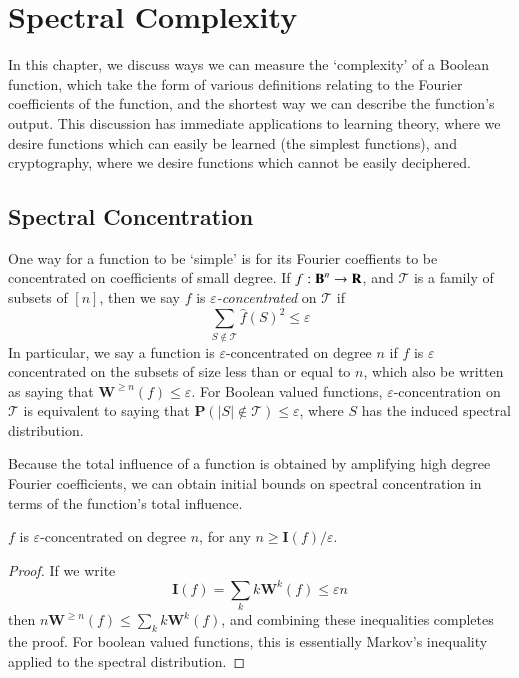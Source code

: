 \chapter{Spectral Complexity}

In this chapter, we discuss ways we can measure the `complexity' of a Boolean function, which take the form of various definitions relating to the Fourier coefficients of the function, and the shortest way we can describe the function's output. This discussion has immediate applications to learning theory, where we desire functions which can easily be learned (the simplest functions), and cryptography, where we desire functions which cannot be easily deciphered.

\section{Spectral Concentration}

One way for a function to be `simple' is for its Fourier coeffients to be concentrated on coefficients of small degree. If $f: \operatorname{\mathbf{B}}^n \to \mathbf{R}$, and $\mathcal{T}$ is a family of subsets of $[n]$, then we say $f$ is \emph{$\varepsilon$-concentrated} on $\mathcal{T}$ if
%
\[ \sum_{S \not \in \mathcal{T}} \widehat{f}(S)^2 \leq \varepsilon \]
%
In particular, we say a function is $\varepsilon$-concentrated on degree $n$ if $f$ is $\varepsilon$ concentrated on the subsets of size less than or equal to $n$, which also be written as saying that $\mathbf{W}^{\geq n}(f) \leq \varepsilon$. For Boolean valued functions, $\varepsilon$-concentration on $\mathcal{T}$ is equivalent to saying that $\mathbf{P}(|S| \not \in \mathcal{T}) \leq \varepsilon$, where $S$ has the induced spectral distribution.

Because the total influence of a function is obtained by amplifying high degree Fourier coefficients, we can obtain initial bounds on spectral concentration in terms of the function's total influence.

\begin{theorem}
    $f$ is $\varepsilon$-concentrated on degree $n$, for any $n \geq \mathbf{I}(f)/\varepsilon$.
\end{theorem}
\begin{proof}
    If we write
    \[ \mathbf{I}(f) = \sum_k k \mathbf{W}^k(f) \leq \varepsilon n \]
    then $n \mathbf{W}^{\geq n}(f) \leq \sum_k k \mathbf{W}^k(f)$, and combining these inequalities completes the proof. For boolean valued functions, this is essentially Markov's inequality applied to the spectral distribution.
\end{proof}

